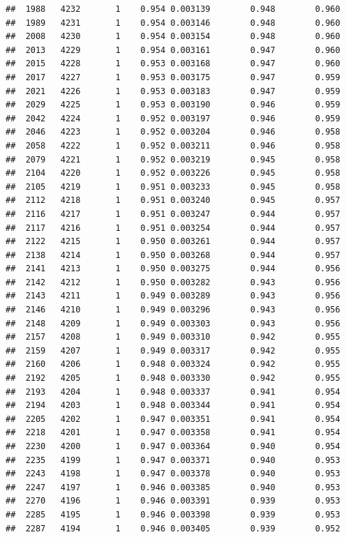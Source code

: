 \documentclass[
]{book}
\begin{document}
\begin{verbatim}
##  1988   4232       1    0.954 0.003139        0.948        0.960
##  1989   4231       1    0.954 0.003146        0.948        0.960
##  2008   4230       1    0.954 0.003154        0.948        0.960
##  2013   4229       1    0.954 0.003161        0.947        0.960
##  2015   4228       1    0.953 0.003168        0.947        0.960
##  2017   4227       1    0.953 0.003175        0.947        0.959
##  2021   4226       1    0.953 0.003183        0.947        0.959
##  2029   4225       1    0.953 0.003190        0.946        0.959
##  2042   4224       1    0.952 0.003197        0.946        0.959
##  2046   4223       1    0.952 0.003204        0.946        0.958
##  2058   4222       1    0.952 0.003211        0.946        0.958
##  2079   4221       1    0.952 0.003219        0.945        0.958
##  2104   4220       1    0.952 0.003226        0.945        0.958
##  2105   4219       1    0.951 0.003233        0.945        0.958
##  2112   4218       1    0.951 0.003240        0.945        0.957
##  2116   4217       1    0.951 0.003247        0.944        0.957
##  2117   4216       1    0.951 0.003254        0.944        0.957
##  2122   4215       1    0.950 0.003261        0.944        0.957
##  2138   4214       1    0.950 0.003268        0.944        0.957
##  2141   4213       1    0.950 0.003275        0.944        0.956
##  2142   4212       1    0.950 0.003282        0.943        0.956
##  2143   4211       1    0.949 0.003289        0.943        0.956
##  2146   4210       1    0.949 0.003296        0.943        0.956
##  2148   4209       1    0.949 0.003303        0.943        0.956
##  2157   4208       1    0.949 0.003310        0.942        0.955
##  2159   4207       1    0.949 0.003317        0.942        0.955
##  2160   4206       1    0.948 0.003324        0.942        0.955
##  2192   4205       1    0.948 0.003330        0.942        0.955
##  2193   4204       1    0.948 0.003337        0.941        0.954
##  2194   4203       1    0.948 0.003344        0.941        0.954
##  2205   4202       1    0.947 0.003351        0.941        0.954
##  2218   4201       1    0.947 0.003358        0.941        0.954
##  2230   4200       1    0.947 0.003364        0.940        0.954
##  2235   4199       1    0.947 0.003371        0.940        0.953
##  2243   4198       1    0.947 0.003378        0.940        0.953
##  2247   4197       1    0.946 0.003385        0.940        0.953
##  2270   4196       1    0.946 0.003391        0.939        0.953
##  2285   4195       1    0.946 0.003398        0.939        0.953
##  2287   4194       1    0.946 0.003405        0.939        0.952

\end{verbatim}
\end{document}
